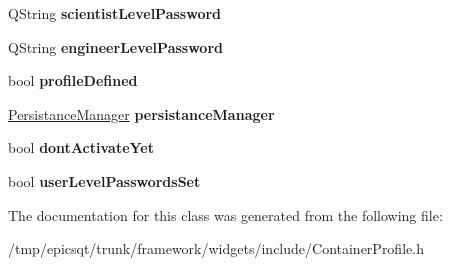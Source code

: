 \begin{DoxyCompactItemize}
\item 
\hypertarget{classPublishedProfile_a72c7ee12485317d9fa0a4919219f2cf1}{
QString {\bfseries scientistLevelPassword}}
\label{classPublishedProfile_a72c7ee12485317d9fa0a4919219f2cf1}

\item 
\hypertarget{classPublishedProfile_af8debc984a484368f4494adba7843ce6}{
QString {\bfseries engineerLevelPassword}}
\label{classPublishedProfile_af8debc984a484368f4494adba7843ce6}

\item 
\hypertarget{classPublishedProfile_acaf7aaa0c63387bd5ec82776f25661ce}{
bool {\bfseries profileDefined}}
\label{classPublishedProfile_acaf7aaa0c63387bd5ec82776f25661ce}

\item 
\hypertarget{classPublishedProfile_ad86d186ebfda86262df3e3daab94e7cd}{
\hyperlink{classPersistanceManager}{PersistanceManager} {\bfseries persistanceManager}}
\label{classPublishedProfile_ad86d186ebfda86262df3e3daab94e7cd}

\item 
\hypertarget{classPublishedProfile_ab13467ccb1eb487f75506a9f44a04b13}{
bool {\bfseries dontActivateYet}}
\label{classPublishedProfile_ab13467ccb1eb487f75506a9f44a04b13}

\item 
\hypertarget{classPublishedProfile_abc027a2c84f1eb71d3ac96846cb4464f}{
bool {\bfseries userLevelPasswordsSet}}
\label{classPublishedProfile_abc027a2c84f1eb71d3ac96846cb4464f}

\end{DoxyCompactItemize}


The documentation for this class was generated from the following file:\begin{DoxyCompactItemize}
\item 
/tmp/epicsqt/trunk/framework/widgets/include/ContainerProfile.h\end{DoxyCompactItemize}
